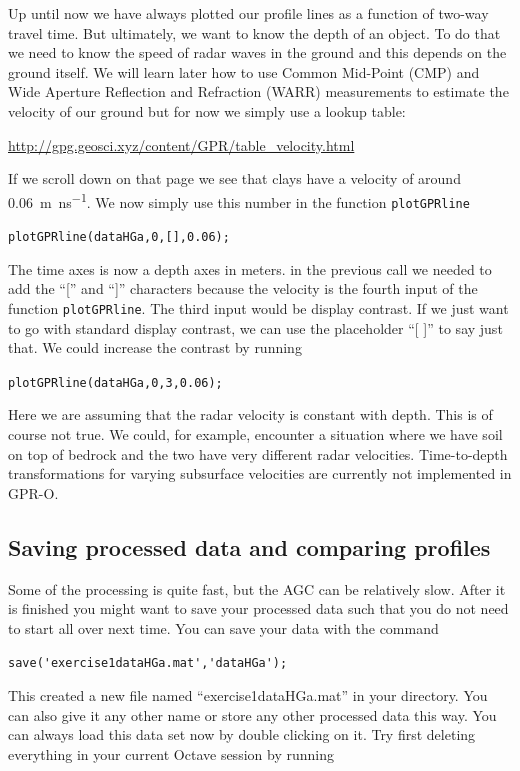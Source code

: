\documentclass[11pt]{article}
\begin{document}
Up until now we have always plotted our profile lines as a function of
two-way travel time. But ultimately, we want to know the depth of an
object. To do that we need to know the speed of radar waves in the
ground and this depends on the ground itself. We will learn later how
to use Common Mid-Point (CMP) and Wide Aperture Reflection and
Refraction (WARR) measurements to estimate the velocity of our ground
but for now we simply use a lookup table:
  
\url{http://gpg.geosci.xyz/content/GPR/table_velocity.html}
  
If we scroll down on that page we see that clays have a velocity of
around \SI{0.06}{m\per\nano\second}. We now simply use this number in the function
\verb#plotGPRline#
  
\qquad \verb#plotGPRline(dataHGa,0,[],0.06);#
  
The time axes is now a depth axes in meters. in the previous call we
needed to add the ``['' and ``]'' characters because the velocity is
the fourth input of the function \verb#plotGPRline#. The third input
would be display contrast. If we just want to go with standard display
contrast, we can use the placeholder ``[ ]'' to say just that. We
could increase the contrast by running
  
\qquad \verb#plotGPRline(dataHGa,0,3,0.06);#

Here we are assuming that the radar velocity is constant with
depth. This is of course not true. We could, for example, encounter a
situation where we have soil on top of bedrock and the two have very
different radar velocities. Time-to-depth transformations for varying
subsurface velocities are currently not implemented in GPR-O.

\subsection{Saving processed data and comparing profiles}

Some of the processing is quite fast, but the AGC can be relatively
slow. After it is finished you might want to
save your processed data such that you do not need to start all over
next time. You can save your data with the command
 
\qquad \verb#save('exercise1dataHGa.mat','dataHGa');#
 
This created a new file named ``exercise1dataHGa.mat'' in your
directory. You can also give it any other name or store any other
processed data this way. You can always load this data set now by
double clicking on it. Try first deleting everything in your current
Octave session by running
 
\end{document}
